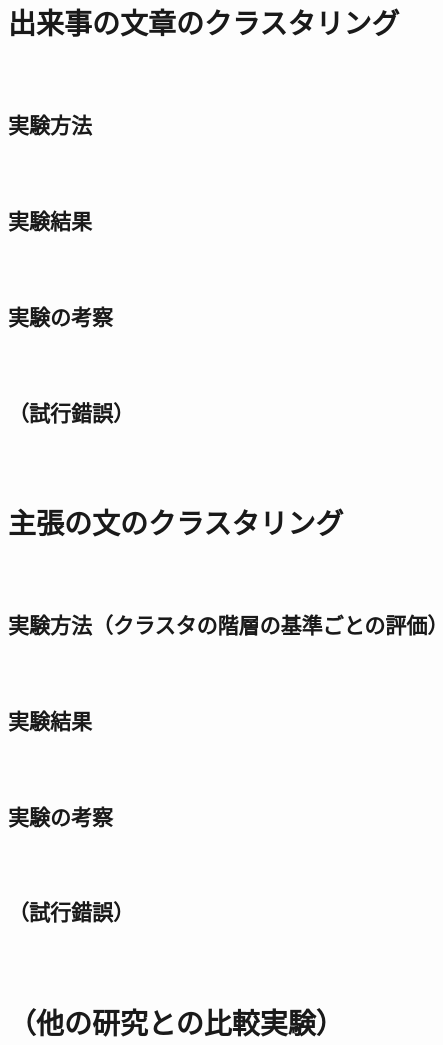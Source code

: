 \documentclass[12pt,a4j]{jreport}
\begin{document}
\section{出来事の文章のクラスタリング}
~

\subsection{実験方法}
~

\subsection{実験結果}
~

\subsection{実験の考察}
~

\subsection{（試行錯誤）}
~

\section{主張の文のクラスタリング}
~

\subsection{実験方法（クラスタの階層の基準ごとの評価）}
~

\subsection{実験結果}
~

\subsection{実験の考察}
~

\subsection{（試行錯誤）}
~

\section{（他の研究との比較実験）}
~
\end{document}
